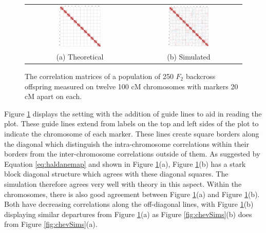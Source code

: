\documentclass{article}
\begin{document}
\begin{figure}[htp]
  \begin{center}
    \begin{tabular}{cc}
      \includegraphics[width = 0.4\textwidth]{./img/LBSimTheory.png} &
      \includegraphics[width = 0.4\textwidth]{./img/LBSim.png} \\
      {\footnotesize (a) Theoretical} &
      {\footnotesize (b) Simulated} \\
    \end{tabular}
  \end{center}
  \caption{The correlation matrices of a population of 250 $F_2$ backcross offspring measured on twelve 100 cM chromosomes with markers 20 cM apart on each.}
  \label{fig:LBSims}
\end{figure}

Figure \ref{fig:LBSims} displays the \cite{LanderBotstein1989} setting with the addition of guide lines to aid in reading the plot. These guide lines extend from labels on the top and left sides of the plot to indicate the chromosome of each marker. These lines create square borders along the diagonal which distinguish the intra-chromosome correlations within their borders from the inter-chromosome correlations outside of them. As suggested by Equation \ref{eq:haldanemap} and shown in Figure \ref{fig:LBSims}(a), Figure \ref{fig:LBSims}(b) has a stark block diagonal structure which agrees with these diagonal squares. The simulation therefore agrees very well with theory in this aspect. Within the chromosomes, there is also good agreement between Figure \ref{fig:LBSims}(a) and Figure \ref{fig:LBSims}(b). Both have decreasing correlations along the off-diagonal lines, with Figure \ref{fig:LBSims}(b) displaying similar departures from Figure \ref{fig:LBSims}(a) as Figure \ref{fig:chevSims}(b) does from Figure \ref{fig:chevSims}(a).
\end{document}
